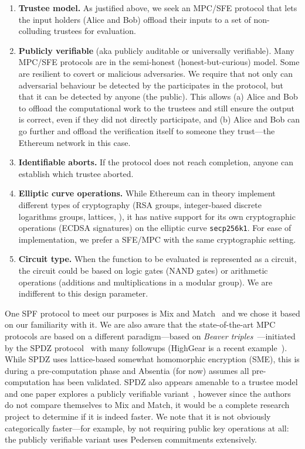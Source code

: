 \begin{enumerate}
\item \textbf{Trustee model.} As justified above, we seek an MPC/SFE protocol that lets the input holders (\eg Alice and Bob) offload their inputs to a set of non-colluding trustees for evaluation. 
\item \textbf{Publicly verifiable} (aka publicly auditable or universally verifiable). Many MPC/SFE protocols are in the semi-honest (\ie honest-but-curious) model. Some are resilient to covert or malicious adversaries. We require that not only can adversarial behaviour  be detected by the participates in the protocol, but that it can be detected by anyone (\ie the public). This allows (a) Alice and Bob to offload the computational work to the trustees and still ensure the output is correct, even if they did not directly participate, and (b) Alice and Bob can go further and offload the verification itself to someone they trust---the Ethereum network in this case.
\item \textbf{Identifiable aborts.} If the protocol does not reach completion, anyone can establish which trustee aborted.
\item \textbf{Elliptic curve operations.} While Ethereum can in theory implement different types of cryptography (RSA groups, integer-based discrete logarithms groups, lattices, \etc), it has native support for its own cryptographic operations (ECDSA signatures) on the elliptic curve \texttt{secp256k1}. For ease of implementation, we prefer a SFE/MPC with the same cryptographic setting. 
\item \textbf{Circuit type.} When the function to be evaluated is represented as a circuit, the circuit could be based on logic gates (\ie NAND gates) or arithmetic operations (\eg additions and multiplications in a modular group). We are indifferent to this design parameter.
\end{enumerate}

One SPF protocol to meet our purposes is Mix and Match~\cite{JJ00} and we chose it based on our familiarity with it. We are also aware that the state-of-the-art MPC protocols are based on a different paradigm---based on \emph{Beaver triples}~\cite{beaver1997commodity}---initiated by the SPDZ protocol~\cite{damgaard2012multiparty,damgaard2013practical} with many followups (HighGear is a recent example~\cite{keller2018overdrive}). While SPDZ uses lattice-based somewhat homomorphic encryption (SME), this is during a pre-computation phase and Absentia (for now) assumes all pre-computation has been validated. SPDZ also appears amenable to a trustee model and one paper explores a publicly verifiable variant~\cite{baum2014publicly}, however since the authors do not compare themselves to Mix and Match, it would be a complete research project to determine if it is indeed faster. We note that it is not obviously categorically faster---for example, by not requiring public key operations at all: the publicly verifiable variant uses Pedersen commitments extensively.  

